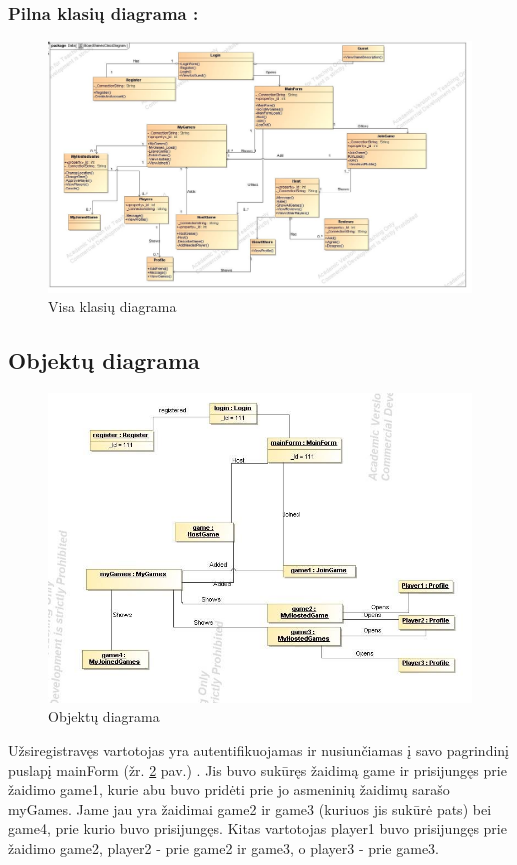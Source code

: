 \documentclass{VUMIFPSkursinis}
\begin{document}
		\subsubsection*{Pilna klasių diagrama :}
			\begin{figure}[H]
				\centering
				\includegraphics[scale=0.4]{img/BoardGamesClassDiagramFull}
				\caption{Visa klasių diagrama}
				\label{img:BoardGamesClassDiagramFull}
			\end{figure}
	\subsection{Objektų diagrama}
		\begin{figure}[H]
				\centering
				\includegraphics[scale=0.5]{img/Object}
				\caption{Objektų diagrama}
				\label{img:Object}
			\end{figure}
		Užsiregistravęs vartotojas yra autentifikuojamas ir nusiunčiamas į savo pagrindinį puslapį mainForm (žr. \ref{img:Object} pav.) . Jis buvo sukūręs žaidimą game ir prisijungęs prie žaidimo game1, kurie abu buvo pridėti prie jo asmeninių žaidimų sarašo myGames. Jame jau yra žaidimai game2 ir game3 (kuriuos jis sukūrė pats) bei game4, prie kurio buvo prisijungęs. Kitas vartotojas player1 buvo prisijungęs prie žaidimo game2, player2 - prie game2 ir game3, o player3 - prie game3.
\end{document}
